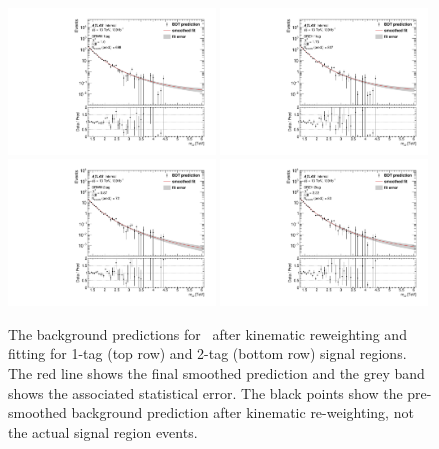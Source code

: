 \begin{figure}[htbp!]
\begin{center}
\includegraphics[width=0.49\textwidth]{VHqqbb_SmoothedBDT_SRWH_1tag.pdf}
\includegraphics[width=0.49\textwidth]{VHqqbb_SmoothedBDT_SRZH_1tag.pdf} \\
\includegraphics[width=0.49\textwidth]{VHqqbb_SmoothedBDT_SRWH_2tag.pdf}
\includegraphics[width=0.49\textwidth]{VHqqbb_SmoothedBDT_SRZH_2tag.pdf}
\end{center}
\caption{
    The background predictions for \mvh\ after kinematic reweighting and fitting for 1-tag (top row) and 2-tag (bottom row) signal regions.
    The red line shows the final smoothed prediction and the grey band shows the associated statistical error.
    The black points show the pre-smoothed background prediction after kinematic re-weighting, not the actual signal region events.
}
\label{fig:sr_smoothed}
\end{figure}


